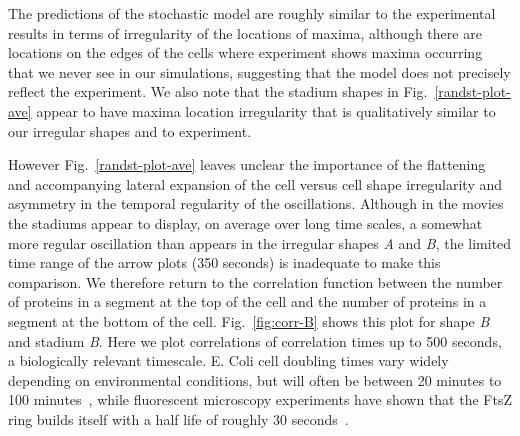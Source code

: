 \documentclass[10pt,letterpaper]{article}
\newcommand{\fixme}[1]{\red{[#1]}}
\newcommand{\red}[1]{{\bf \color{red} #1}}
\begin{document}

The predictions of the stochastic model are roughly similar to the
experimental results in terms of irregularity of the locations of
maxima, although there are locations on the edges of the cells where
experiment shows maxima occurring that we never see in our simulations,
suggesting that the model does not precisely reflect the experiment.
We also note that the stadium shapes in Fig.~\ref{randst-plot-ave}
appear to have maxima location irregularity that is qualitatively
similar to our irregular shapes and to experiment.

However Fig.~\ref{randst-plot-ave} leaves unclear the importance of
the flattening and accompanying lateral expansion of the cell versus
cell shape irregularity and asymmetry in the temporal regularity of
the oscillations.  Although in the movies the stadiums appear to
display, on average over long time scales, a somewhat more regular
oscillation than appears in the irregular shapes \emph{A} and
\emph{B}, the limited time range of the arrow plots (350 seconds) is
inadequate to make this comparison.  We therefore return to the
correlation function between the number of proteins in a segment at
the top of the cell and the number of proteins in a segment at the
bottom of the cell.  Fig.~\ref{fig:corr-B} shows this plot for shape
\emph{B} and stadium \emph{B}.  Here we plot correlations of
correlation times up to 500 seconds, a biologically relevant
timescale.  E. Coli cell doubling times vary widely depending on
environmental conditions, but will often be between 20 minutes to 100
minutes~\cite{pierucci1972chromosome}, while fluorescent microscopy
experiments have shown that the FtsZ ring builds itself with a half
life of roughly 30 seconds~\cite{stricker2002rapid}.
\end{document}
